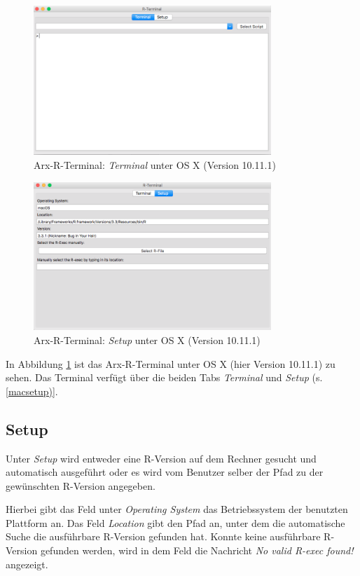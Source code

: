 \documentclass[a4paper, 12pt]{report} %
\begin{document}
\begin{figure}[htpb]
\centering
\includegraphics[width=0.8\textwidth]{R-Terminal}
\caption{Arx-R-Terminal: \textit{Terminal} unter OS X (Version 10.11.1)}
\label{rterminalmac}
\end{figure}

\begin{figure}[htpb]
\centering
\includegraphics[width=0.8\textwidth]{rterminalsetup}
\caption{Arx-R-Terminal: \textit{Setup} unter OS X (Version 10.11.1)}
\label{macsetup}
\end{figure}

In Abbildung \ref{rterminalmac} ist das Arx-R-Terminal unter OS X (hier Version 10.11.1) zu sehen. Das Terminal verfügt über die beiden Tabs \textit{Terminal} und \textit{Setup} (s. \ref{macsetup)}. 

\subsection{Setup}
Unter \textit{Setup} wird entweder eine R-Version auf dem Rechner gesucht und automatisch ausgeführt oder es wird vom Benutzer selber der Pfad zu der gewünschten R-Version angegeben. 

Hierbei gibt das Feld unter \textit{Operating System} das Betriebssystem der benutzten Plattform an. Das Feld \textit{Location} gibt den Pfad an, unter dem die automatische Suche die ausführbare R-Version gefunden hat. Konnte keine ausführbare R-Version gefunden werden, wird in dem Feld die Nachricht \textit{No valid R-exec found!} angezeigt. 
\end{document}
